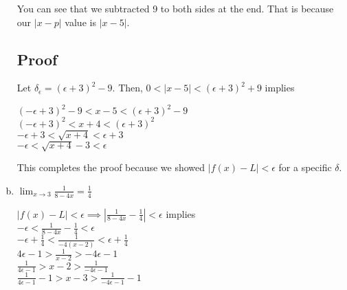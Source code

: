 \documentclass{article}
\newcommand\abs[1]{\left|#1\right|}
\begin{document}
\begin{flushleft}
\begin{enumerate}[(a)]
You can see that we subtracted 9 to both sides at the end. That is because our $\abs{x-p}$ value is $\abs{x-5}$. \\

\subsection*{Proof}
Let $\delta_\epsilon = (\epsilon + 3)^2 - 9$. Then, $0 < \abs{x-5} < (\epsilon + 3)^2 + 9$ implies \\
\begin{center}
\vspace{.2cm}
$(-\epsilon  + 3)^2 - 9 < x - 5 < (\epsilon + 3)^2 - 9$ \\
\vspace{.2cm}
$(-\epsilon  + 3)^2 < x + 4 < (\epsilon + 3)^2$ \\
\vspace{.2cm}
$-\epsilon  + 3< \sqrt{x + 4} < \epsilon + 3$ \\
\vspace{.2cm}
$-\epsilon < \sqrt{x + 4} - 3 < \epsilon$ \\
\end{center}

This completes the proof because we showed $\abs{f(x) - L} < \epsilon$ for a specific $\delta$. \\

\item $\displaystyle \lim_{x \to 3} \frac{1}{8 - 4x} = \frac{1}{4}$


\begin{center}
$\abs{f(x) - L} < \epsilon \implies \abs{\frac{1}{8 - 4x} - \frac{1}{4}} < \epsilon$ implies \\
\vspace{.3cm}
$-\epsilon < \frac{1}{8 - 4x} - \frac{1}{4} < \epsilon$ \\
\vspace{.2cm}
$-\epsilon + \frac{1}{4} < \frac{1}{-4(x-2)} < \epsilon + \frac{1}{4}$ \\
\vspace{.2cm}
$4\epsilon - 1 > \frac{1}{x-2} > -4\epsilon - 1$ \\
\vspace{.2cm}
$\frac{1}{4\epsilon - 1} > x-2 > \frac{1}{-4\epsilon - 1}$ \\
\vspace{.2cm}
$\frac{1}{4\epsilon - 1} - 1> x-3 > \frac{1}{-4\epsilon - 1} - 1$ \\
\end{center}


\end{enumerate}
\end{flushleft}
\end{document}
